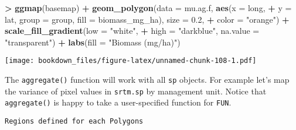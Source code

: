\documentclass[]{krantz}
\makeatletter
\newenvironment{Shaded}{\begin{snugshade}}{\end{snugshade}}
\newcommand{\KeywordTok}[1]{\textcolor[rgb]{0.27,0.27,0.27}{\textbf{#1}}}
\newcommand{\DataTypeTok}[1]{\textcolor[rgb]{0.27,0.27,0.27}{#1}}
\newcommand{\FloatTok}[1]{\textcolor[rgb]{0.06,0.06,0.06}{#1}}
\newcommand{\StringTok}[1]{\textcolor[rgb]{0.5,0.5,0.5}{#1}}
\newcommand{\ControlFlowTok}[1]{\textcolor[rgb]{0.27,0.27,0.27}{\textbf{#1}}}
\newcommand{\OperatorTok}[1]{\textcolor[rgb]{0.43,0.43,0.43}{\textbf{#1}}}
\newcommand{\ErrorTok}[1]{\textcolor[rgb]{0.14,0.14,0.14}{\textbf{#1}}}
\newcommand{\NormalTok}[1]{#1}
\newenvironment{kframe}{%
\medskip{}
\setlength{\fboxsep}{.8em}
 \def\at@end@of@kframe{}%
 \ifinner\ifhmode%
  \def\at@end@of@kframe{\end{minipage}}%
  \begin{minipage}{\columnwidth}%
 \fi\fi%
 \def\FrameCommand##1{\hskip\@totalleftmargin \hskip-\fboxsep
 \colorbox{shadecolor}{##1}\hskip-\fboxsep
     \hskip-\linewidth \hskip-\@totalleftmargin \hskip\columnwidth}%
 \MakeFramed {\advance\hsize-\width
   \@totalleftmargin\z@ \linewidth\hsize
   \@setminipage}}%
 {\par\unskip\endMakeFramed%
 \at@end@of@kframe}
\renewenvironment{Shaded}{\begin{kframe}}{\end{kframe}}
\theoremstyle{definition}
\theoremstyle{definition}
\theoremstyle{definition}
\theoremstyle{remark}
\makeatother
\begin{document}
\begin{Shaded}
\begin{Highlighting}[]
\OperatorTok{>}\StringTok{ }\KeywordTok{ggmap}\NormalTok{(basemap) }\OperatorTok{+}\StringTok{ }\KeywordTok{geom_polygon}\NormalTok{(}\DataTypeTok{data =}\NormalTok{ mu.ag.f, }\KeywordTok{aes}\NormalTok{(}\DataTypeTok{x =}\NormalTok{ long, }
\OperatorTok{+}\StringTok{   }\DataTypeTok{y =}\NormalTok{ lat, }\DataTypeTok{group =}\NormalTok{ group, }\DataTypeTok{fill =}\NormalTok{ biomass_mg_ha), }\DataTypeTok{size =} \FloatTok{0.2}\NormalTok{, }
\OperatorTok{+}\StringTok{   }\DataTypeTok{color =} \StringTok{"orange"}\NormalTok{) }\OperatorTok{+}\StringTok{ }\KeywordTok{scale_fill_gradient}\NormalTok{(}\DataTypeTok{low =} \StringTok{"white"}\NormalTok{, }
\OperatorTok{+}\StringTok{   }\DataTypeTok{high =} \StringTok{"darkblue"}\NormalTok{, }\DataTypeTok{na.value =} \StringTok{"transparent"}\NormalTok{) }\OperatorTok{+}\StringTok{ }\KeywordTok{labs}\NormalTok{(}\DataTypeTok{fill =} \StringTok{"Biomass (mg/ha)"}\NormalTok{)}
\end{Highlighting}
\end{Shaded}

\texttt{[image: bookdown\_files/figure-latex/unnamed-chunk-108-1.pdf]}

The \texttt{aggregate()} function will work with all \texttt{sp}
objects. For example let's map the variance of pixel values in
\texttt{srtm.sp} by management unit. Notice that \texttt{aggregate()} is
happy to take a user-specified function for \texttt{FUN}.

\begin{Shaded}
\end{Shaded}

\begin{verbatim}
Regions defined for each Polygons
\end{verbatim}
\end{document}
